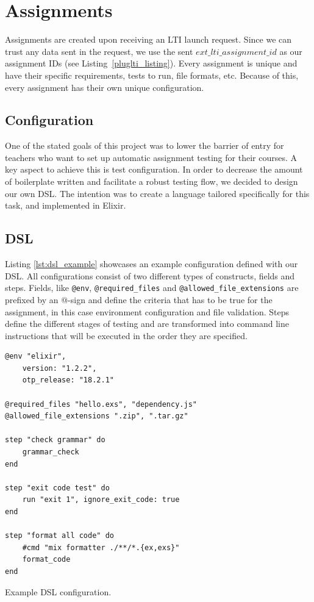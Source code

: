 \section{Assignments}

Assignments are created upon receiving an LTI launch request. Since we can trust any data sent in the request, we use the sent $ext\_lti\_assignment\_id$ as our assignment IDs (see Listing~\ref{pluglti_listing}). Every assignment is unique and have their specific requirements, tests to run, file formats, etc. Because of this, every assignment has their own unique configuration.

\subsection{Configuration}
One of the stated goals of this project was to lower the barrier of entry for teachers who want to set up automatic assignment testing for their courses. A key aspect to achieve this is test configuration. In order to decrease the amount of boilerplate written and facilitate a robust testing flow, we decided to design our own DSL. The intention was to create a language tailored specifically for this task, and implemented in Elixir.


\subsection{DSL}
Listing \ref{lst:dsl_example} showcases an example configuration defined with our DSL. All configurations consist of two different types of constructs, fields and steps. Fields, like \texttt{@env}, \texttt{@required_files} and \texttt{@allowed_file_extensions} are prefixed by an @-sign and define the criteria that has to be true for the assignment, in this case environment configuration and file validation. Steps define the different stages of testing and are transformed into command line instructions that will be executed in the order they are specified.

\begin{listing}
\begin{verbatim}
@env "elixir",
	version: "1.2.2",
	otp_release: "18.2.1"

@required_files "hello.exs", "dependency.js"
@allowed_file_extensions ".zip", ".tar.gz"

step "check grammar" do
	grammar_check
end

step "exit code test" do
	run "exit 1", ignore_exit_code: true
end

step "format all code" do
	#cmd "mix formatter ./**/*.{ex,exs}"
	format_code
end
\end{verbatim}
\caption{Example DSL configuration.}
\label{lst:dsl_example}
\end{listing}


